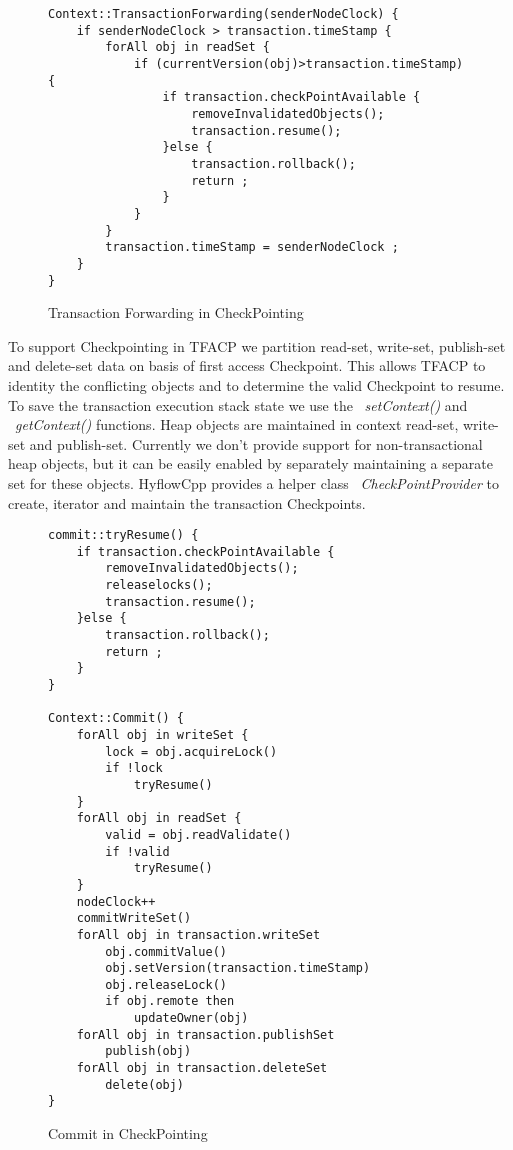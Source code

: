 \documentclass[12pt,english]{report}
\begin{document}
\begin{figure} [H]
\begin{minipage}[b]{0.9\linewidth}\centering
\begin{lstlisting}
Context::TransactionForwarding(senderNodeClock) {
	if senderNodeClock > transaction.timeStamp {
		forAll obj in readSet {
			if (currentVersion(obj)>transaction.timeStamp) { 
				if transaction.checkPointAvailable {
					removeInvalidatedObjects();
					transaction.resume();
				}else {
					transaction.rollback();
					return ;
				}		
			}
		}
		transaction.timeStamp = senderNodeClock ; 
	}
}
\end{lstlisting}
\end{minipage}
\caption{Transaction Forwarding in CheckPointing}
\label{Fig:CheckPointTFA}
\end{figure} 

To support Checkpointing in TFACP we partition read-set, write-set, publish-set and delete-set data on basis of first access Checkpoint. This allows TFACP to identity the conflicting objects and to determine the valid Checkpoint to resume. To save the transaction execution stack state we use the ~\emph{setContext()} and ~\emph{getContext()} functions. Heap objects are maintained in context read-set, write-set and publish-set. Currently we don't provide support for non-transactional heap objects, but it can be easily enabled by separately maintaining a separate set for these objects. HyflowCpp provides a helper class ~\emph{CheckPointProvider} to create, iterator and maintain the transaction Checkpoints.     

\begin{figure}[H]
\begin{minipage}[b]{0.9\linewidth}\centering
\begin{lstlisting}
commit::tryResume() {
	if transaction.checkPointAvailable {
		removeInvalidatedObjects();
		releaselocks();
		transaction.resume();
	}else {
		transaction.rollback();
		return ;
	}		
}

Context::Commit() {
	forAll obj in writeSet {
		lock = obj.acquireLock()
		if !lock
			tryResume()
	}
	forAll obj in readSet {
		valid = obj.readValidate()
		if !valid
			tryResume()
	}
	nodeClock++
	commitWriteSet()
	forAll obj in transaction.writeSet
		obj.commitValue()
 		obj.setVersion(transaction.timeStamp)
 		obj.releaseLock()
 		if obj.remote then
 			updateOwner(obj)
	forAll obj in transaction.publishSet
		publish(obj)
	forAll obj in transaction.deleteSet
		delete(obj)
}
\end{lstlisting}
\end{minipage}
\caption{Commit in CheckPointing}
\label{Fig:CheckPointCommit}
\end{figure}
\end{document}
